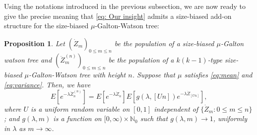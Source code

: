\documentclass[12pt,a4paper]{amsart}
\newtheorem{prop}[thm]{Proposition}
\numberwithin{equation}{section}
\begin{document}
	Using the notations introduced in the previous subsection, we are now ready to 
 give the precise meaning that \eqref{eq: Our insight} admits a size-biased add-on structure 
	for the size-biased $\mu$-Galton-Watson tree:
\begin{prop}\label{prop: size-biased add-on of size-biased tree }
	Let $(\dot Z_m)_{0 \leq m \leq n}$ be the population of a size-biased $\mu$-Galton watson tree and $(\ddot Z^{(n)}_m)_{0 \leq m \leq n}$ be the population of a $k(k-1)$-type size-biased $\mu$-Galton-Watson tree with height $n$.
	Suppose that $\mu$ satisfies \eqref{eq:mean} and \eqref{eq:variance}.
	Then, we have
\[
	E [ e^{- \lambda \ddot Z_n^{(n)}} ]
	= E [e^{-\lambda \dot Z_n}] E[g(\lambda, [Un])e^{-\lambda \dot Z_{[Un]}}],
\]
where $U$ is a uniform random variable on $[0,1]$ independent of $\{\dot Z_m: 0\le m\le n\}$; 
and $g(\lambda, m)$ is a function on $[0,\infty) \times \mathbb N_0$ such that
$g(\lambda, m) \to 1$, uniformly in $\lambda$ as $m\to \infty$.
\end{prop}
\end{document}
